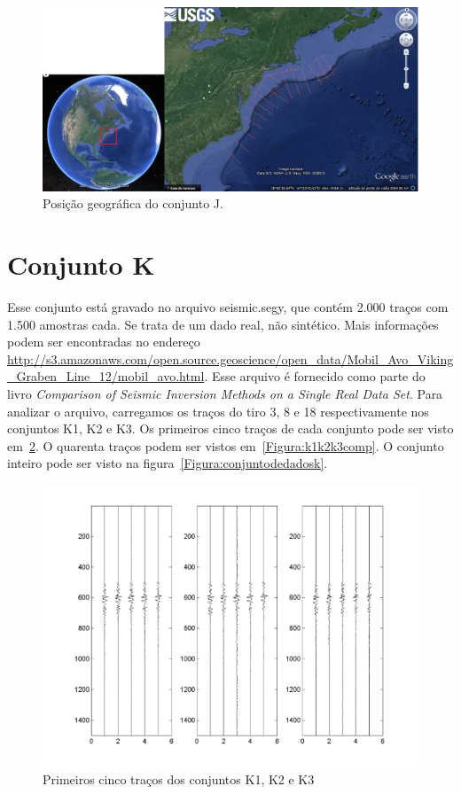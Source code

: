 \begin{figure}[ht]
\centering
\includegraphics[scale=0.75]{fig/gps_img_j.png}
\caption[Posição do conjunto J]{Posição geográfica do conjunto J.}
\label{Figura:geograficamentefigj}
\end{figure}

\section{Conjunto K}

Esse conjunto está gravado no arquivo seismic.segy, que contém 2.000 traços com
1.500 amostras cada. Se trata de um dado real, não sintético. Mais informações
podem ser encontradas no endereço
\url{http://s3.amazonaws.com/open.source.geoscience/open_data/Mobil_Avo_Viking_Graben_Line_12/mobil_avo.html}.
Esse arquivo é fornecido como parte do livro \emph{Comparison of Seismic
Inversion Methods on a Single Real Data Set}. Para analizar o arquivo,
carregamos os traços do tiro 3, 8 e 18 respectivamente nos conjuntos K1, K2 e
K3.  Os primeiros cinco traços de cada conjunto pode ser
visto em~\ref{Figura:k1k2k3}. O quarenta traços podem ser vistos
em~\ref{Figura:k1k2k3comp}. O conjunto inteiro pode ser visto na
figura~\ref{Figura:conjuntodedadosk}.

\begin{figure}[!h]
\centering
  \includegraphics[scale=1.01]{fig/fig_K1.png}
  \caption{Primeiros cinco traços dos conjuntos K1, K2 e K3}
  \label{Figura:k1k2k3}
\end{figure}

